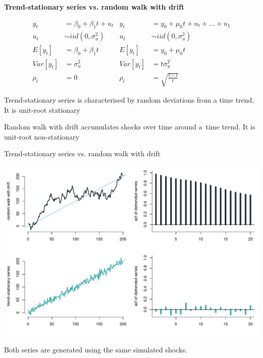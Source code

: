 \documentclass[notes,blackandwhite,mathsans]{beamer}
\begin{document}
\begin{frame}

\begin{center}
\textbf{Trend-stationary series vs. random walk with drift}
\end{center}
\begin{align*}
y_t &= \beta_0 +\beta_1 t + u_t & y_t &= y_{0} +\mu_0 t + u_t +\dots+ u_{1}\\
u_t &\sim iid\left(0,\sigma_u^2\right) & u_t &\sim iid\left(0,\sigma_u^2\right)\\[2ex]
E[y_t] &= \beta_0 +\beta_1 t & E[y_t] &= y_{0} +\mu_0 t\\
Var[y_t] &= \sigma_u^2 & Var[y_t] &= t\sigma_u^2\\
\rho_l &= 0 & \rho_l&= \sqrt{\frac{t-l}{t}}
\end{align*}

Trend-stationary series {\color{mcxs3}is characterised by random deviations from a time trend. It is unit-root stationary}

\bigskip Random walk with drift {\color{mcxs3}accumulates shocks over time around a~time trend. It is unit-root non-stationary}
\end{frame}




{
\begin{frame}{Trend-stationary series vs. random walk with drift}

\begin{center}
\includegraphics[scale=0.5, trim=0cm 0.6cm 0cm 0.5cm]{grphs/sim-tss-acfs.pdf}

{\color{mcxs2}Both series are generated using the same simulated shocks.}
\end{center}
\end{frame}
}
\end{document}
